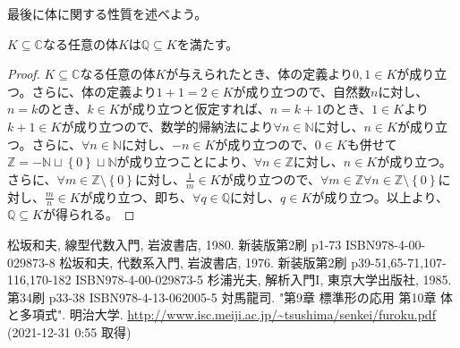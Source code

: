 \documentclass[dvipdfmx]{jsarticle}
\begin{document}
最後に体に関する性質を述べよう。
\begin{thm}\label{4.1.2.14}
$K \subseteq \mathbb{C}$なる任意の体$K$は$\mathbb{Q} \subseteq K$を満たす。
\end{thm}
\begin{proof}
$K \subseteq \mathbb{C}$なる任意の体$K$が与えられたとき、体の定義より$0,1 \in K$が成り立つ。さらに、体の定義より$1 + 1 = 2 \in K$が成り立つので、自然数$n$に対し、$n = k$のとき、$k \in K$が成り立つと仮定すれば、$n = k + 1$のとき、$1 \in K$より$k + 1 \in K$が成り立つので、数学的帰納法により$\forall n \in \mathbb{N}$に対し、$n \in K$が成り立つ。さらに、$\forall n \in \mathbb{N}$に対し、$- n \in K$が成り立つので、$0 \in K$も併せて$\mathbb{Z} = - \mathbb{N} \sqcup \left\{ 0 \right\} \sqcup \mathbb{N}$が成り立つことにより、$\forall n \in \mathbb{Z}$に対し、$n \in K$が成り立つ。さらに、$\forall m \in \mathbb{Z} \setminus \left\{ 0 \right\}$に対し、$\frac{1}{m} \in K$が成り立つので、$\forall m \in \mathbb{Z}\forall n \in \mathbb{Z} \setminus \left\{ 0 \right\}$に対し、$\frac{m}{n} \in K$が成り立つ、即ち、$\forall q \in \mathbb{Q}$に対し、$q \in K$が成り立つ。以上より、$\mathbb{Q} \subseteq K$が得られる。
\end{proof}
\begin{thebibliography}{50}
  松坂和夫, 線型代数入門, 岩波書店, 1980. 新装版第2刷 p1-73 ISBN978-4-00-029873-8
  松坂和夫, 代数系入門, 岩波書店, 1976. 新装版第2刷 p39-51,65-71,107-116,170-182 ISBN978-4-00-029873-5
  杉浦光夫, 解析入門I, 東京大学出版社, 1985. 第34刷 p33-38 ISBN978-4-13-062005-5
  対馬龍司. "第9章 標準形の応用 第10章 体と多項式". 明治大学. \url{http://www.isc.meiji.ac.jp/~tsushima/senkei/furoku.pdf} (2021-12-31 0:55 取得)
\end{thebibliography}
\end{document}
